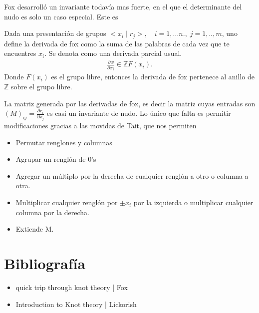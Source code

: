 \documentclass{article}
\theoremstyle{mytheoremstyle}
\theoremstyle{mytheoremstyle}
\theoremstyle{myproblemstyle}
\begin{document}
Fox desarrolló un invariante todavía mas fuerte, en el que el determinante del nudo es solo un caso especial. Este es 
\begin{definition}
  Dada una presentación de grupos $<x_i\; | \;r_j >,\quad i=1,...n., \; j=1,.. ,m$, uno define la derivada de fox como la suma de las palabras de cada vez que te encuentres $x_i$. Se denota como una derivada parcial usual.
  \begin{align}
    \frac{\partial w}{\partial x_i} \in \mathbb{Z}F(x_i).
  \end{align}
  Donde $F(x_i)$ es el grupo libre, entonces la derivada de fox pertenece al anillo de $\mathbb{Z}$ sobre el grupo libre.
\end{definition}

La matriz generada por las derivadas de fox, es decir la matriz cuyas entradas son $(M)_{ij}= \frac{\partial r_i}{\partial x_j}$ es casi un invariante de nudo. Lo único que falta es permitir modificaciones gracias a las movidas de Tait, que nos permiten 

\begin{itemize}
  \item Permutar renglones y columnas 
  \item Agrupar un renglón de 0's 
  \item Agregar un múltiplo por la derecha de cualquier renglón a otro o columna a otra. 
  \item Multiplicar cualquier renglón por $\pm x_i$ por la izquierda o multiplicar cualquier columna por la derecha. 
  \item Extiende M.
\end{itemize}


\section{Bibliografía}
\begin{itemize}
  \item quick trip through knot theory | Fox 
  \item Introduction to Knot theory | Lickorish  
\end{itemize}
\end{document}
